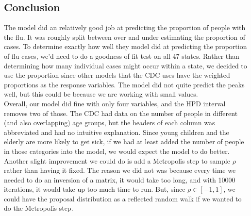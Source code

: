 \documentclass[12pt, onesided]{article}
\begin{document}
\begin{flushleft}
\section{Conclusion}
The model did an relatively good job at predicting the proportion of people with the flu. It was roughly split between over and under estimating the proportion of cases. To determine exactly how well they model did at predicting the proportion of flu cases, we'd need to do a goodness of fit test on all 47 states. Rather than determining how many individual cases might occur within a state, we decided to use the proportion since other models that the CDC uses have the weighted proportions as the response variables. The model did not quite predict the peaks well, but this could be because we are working with small values.\\
\indent Overall, our model did fine with only four variables, and the HPD interval removes two of those. The CDC had data on the number of people in different (and also overlapping) age groups, but the headers of each column was abbreviated and had no intuitive explanation. Since young children and the elderly are more likely to get sick, if we had at least added the number of people in those categories into the model, we would expect the model to do better. \\
\indent Another slight improvement we could do is add a Metropolis step to sample $\rho$ rather than having it fixed. The reason we did not was because every time we needed to do an inversion of a matrix, it would take too long, and with 10000 iterations, it would take up too much time to run. But, since $\rho \in [-1,1]$, we could have the proposal distribution as a reflected random walk if we wanted to do the Metropolis step.

\newpage


\end{flushleft}
\newpage
\end{document}
